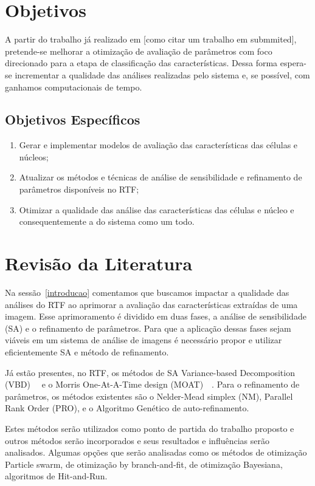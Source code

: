 \documentclass[a4paper,10pt]{article}
\begin{document}
\section{Objetivos}

A partir do trabalho já realizado em [como citar um trabalho em submmited], pretende-se melhorar a otimização de avaliação de parâmetros com foco direcionado para a etapa de classificação das características. Dessa forma espera-se incrementar a qualidade das análises realizadas pelo sistema e, se possível, com ganhamos computacionais de tempo.


\subsection{Objetivos Específicos}

\begin{enumerate}
	\item  Gerar e implementar modelos de avaliação das características das células e núcleos;
\item  Atualizar os métodos e técnicas de análise de sensibilidade e refinamento de parâmetros disponíveis no RTF;
\item Otimizar a qualidade das análise das características das células e núcleo e consequentemente a do sistema como um todo.
\end{enumerate}


\section{Revisão da Literatura}

Na sessão~\ref{introducao} comentamos que buscamos impactar a qualidade das análises do RTF ao aprimorar a avaliação das características extraídas de uma imagem. Esse aprimoramento é dividido em duas fases, a análise de sensibilidade (SA) e o refinamento de parâmetros. Para que a aplicação dessas fases sejam viáveis em um sistema de análise de imagens é necessário propor e utilizar eficientemente SA e método de refinamento.

Já estão presentes, no RTF, os métodos de SA Variance-based Decomposition (VBD)~\cite{weirs2012sensitivity}~\cite{sobol2001global}  e o Morris One-At-A-Time design (MOAT)~\cite{morris1991factorial}~\cite{campolongo2007effective}. Para o refinamento de parâmetros, os métodos existentes são o Nelder-Mead simplex (NM), Parallel Rank Order (PRO), e o Algoritmo Genético de auto-refinamento. 

Estes métodos serão utilizados como ponto de partida do trabalho proposto e outros métodos serão incorporados e seus resultados e influências serão analisados. Algumas opções que serão analisadas como os métodos de otimização Particle swarm, de otimização by branch-and-fit, de otimização Bayesiana, algoritmos de Hit-and-Run.
\end{document}

